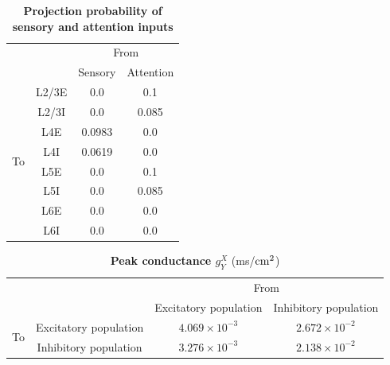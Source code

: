 \documentclass[10pt,letterpaper]{article}
\begin{document}
\begin{table}[!ht]
\centering
\caption{
{\bf Projection probability of sensory and attention inputs}}
\begin{tabular}[t]{cccc}
\toprule
&&\multicolumn{2}{c}{From} \\
&& Sensory & Attention \\
\midrule
\multirow{8}{*}{To} & \multicolumn{1}{c|}{L2/3E} & 0.0 & 0.1 \\ %
&\multicolumn{1}{c|}{L2/3I} & 0.0 & 0.085 \\ %
&\multicolumn{1}{c|}{L4E} & 0.0983 & 0.0 \\ %
&\multicolumn{1}{c|}{L4I} & 0.0619 & 0.0 \\ %
&\multicolumn{1}{c|}{L5E} &  0.0 & 0.1 \\ %
&\multicolumn{1}{c|}{L5I} &  0.0 & 0.085 \\ %
&\multicolumn{1}{c|}{L6E} &  0.0 & 0.0 \\ %
&\multicolumn{1}{c|}{L6I} &  0.0 & 0.0 \\ %
\bottomrule
\end{tabular}
\label{table3}
\end{table}

\begin{table}[!ht]
\centering
\caption{
{\bf Peak conductance $g_{Y}^{X}$} (ms/$\rm cm^{2}$)}
\begin{tabular}[t]{cccc}
\toprule
&&\multicolumn{2}{c}{From} \\
&& Excitatory population & Inhibitory population \\
\midrule
\multirow{2}{*}{To} & \multicolumn{1}{c|}{Excitatory population} & $4.069\times10^{-3}$ & $2.672\times10^{-2}$ \\
&\multicolumn{1}{c|}{Inhibitory population} & $3.276\times10^{-3}$ & $2.138\times10^{-2}$ \\ %
\bottomrule
\end{tabular}
\label{table4}
\end{table}

\end{document}
